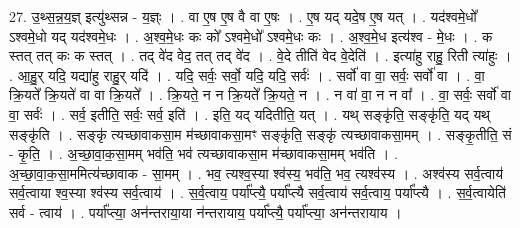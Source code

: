 \documentclass[17pt]{extarticle}
\begin{document}
27. उ॒थ्स॒न्न॒य॒ज्ञ् इत्यु॑थ्सन्न - य॒ज्ञ्ः । . वा ए॒ष ए॒ष वै वा ए॒षः । . ए॒ष यद् यदे॒ष ए॒ष यत् । . यद॑श्वमे॒धो᳚ ऽश्वमे॒धो यद् यद॑श्वमे॒धः । . अ॒श्व॒मे॒धः कः को᳚ ऽश्वमे॒धो᳚ ऽश्वमे॒धः कः । . अ॒श्व॒मे॒ध इत्य॑श्व - मे॒धः । . क स्तत् तत् कः क स्तत् । . तद् वे॑द वेद॒ तत् तद् वे॑द । . वे॒दे तीति॑ वेद वे॒देति॑ । . इत्या॑हु राहु॒ रिती त्या॑हुः । . आ॒हु॒र् यदि॒ यद्या॑हु राहु॒र् यदि॑ । . यदि॒ सर्वः॒ सर्वो॒ यदि॒ यदि॒ सर्वः॑ । . सर्वो॑ वा वा॒ सर्वः॒ सर्वो॑ वा । . वा॒ क्रि॒यते᳚ क्रि॒यते॑ वा वा क्रि॒यते᳚ । . क्रि॒यते॒ न न क्रि॒यते᳚ क्रि॒यते॒ न । . न वा॑ वा॒ न न वा᳚ । . वा॒ सर्वः॒ सर्वो॑ वा वा॒ सर्वः॑ । . सर्व॒ इतीति॒ सर्वः॒ सर्व॒ इति॑ । . इति॒ यद् यदितीति॒ यत् । . यथ् सङ्कृ॑ति॒ सङ्कृ॑ति॒ यद् यथ् सङ्कृ॑ति । . सङ्कृ॑ त्यच्छावाकसा॒म म॑च्छावाकसा॒मꣳ सङ्कृ॑ति॒ सङ्कृ॑ त्यच्छावाकसा॒मम् । . सङ्कृ॒तीति॒ सं - कृ॒ति॒ । . अ॒च्छा॒वा॒क॒सा॒मम् भव॑ति॒ भव॑ त्यच्छावाकसा॒म म॑च्छावाकसा॒मम् भव॑ति । . अ॒च्छा॒वा॒क॒सा॒ममित्य॑च्छावाक - सा॒मम् । . भव॒ त्यश्व॒स्या श्व॑स्य॒ भव॑ति॒ भव॒ त्यश्व॑स्य । . अश्व॑स्य सर्व॒त्वाय॑ सर्व॒त्वाया श्व॒स्या श्व॑स्य सर्व॒त्वाय॑ । . स॒र्व॒त्वाय॒ पर्या᳚प्त्यै॒ पर्या᳚प्त्यै सर्व॒त्वाय॑ सर्व॒त्वाय॒ पर्या᳚प्त्यै । . स॒र्व॒त्वायेति॑ सर्व - त्वाय॑ । . पर्या᳚प्त्या॒ अन॑न्तराया॒या न॑न्तरायाय॒ पर्या᳚प्त्यै॒ पर्या᳚प्त्या॒ अन॑न्तरायाय । \newline
\end{document}
